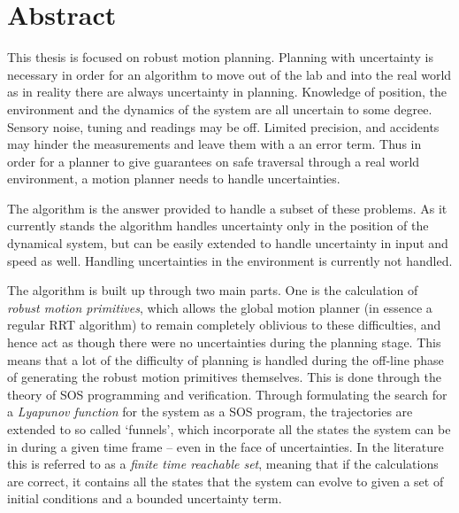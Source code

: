 \chapter{Abstract}

\abstractintoc{} %


This thesis is focused on robust motion planning. Planning with uncertainty is
necessary in order for an algorithm to move out of the lab and into the real
world as in reality there are always uncertainty in planning. Knowledge of
position, the environment and the dynamics of the system are all uncertain to
some degree. Sensory noise, tuning and readings may be off. Limited precision,
and accidents may hinder the measurements and leave them with a an error term.
Thus in order for a planner to give guarantees on safe traversal through a real
world environment, a motion planner needs to handle uncertainties.

The \rrtfunnel{} algorithm is the answer provided to handle a subset of these
problems. As it currently stands the algorithm handles uncertainty only in the
position of the dynamical system, but can be easily extended to handle
uncertainty in input and speed as well. Handling uncertainties in the
environment is currently not handled.

The algorithm is built up through two main parts. One is the calculation of
\textit{robust motion primitives}, which allows the global motion planner (in
essence a regular \ac{RRT} algorithm) to remain completely oblivious to these
difficulties, and hence act as though there were no uncertainties during the
planning stage. This means that a lot of the difficulty of planning is handled
during the off-line phase of generating the robust motion primitives themselves.
This is done through the theory of \ac{SOS} programming and verification.
Through formulating the search for a \textit{Lyapunov function} for the system
as a \ac{SOS} program, the trajectories are extended to so called `funnels',
which incorporate all the states the system can be in during a given time frame
-- even in the face of uncertainties. In the literature this is referred to as a
\textit{finite time reachable set}, meaning that if the calculations are
correct, it contains all the states that the system can evolve to given a set of
initial conditions and a bounded uncertainty term.


